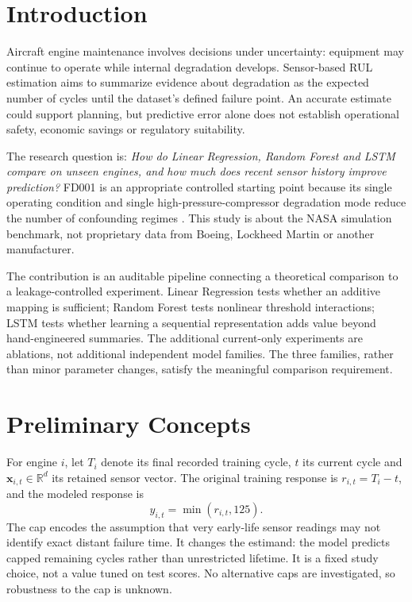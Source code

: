 \documentclass[11pt]{article}
\begin{document}
\section{Introduction}
Aircraft engine maintenance involves decisions under uncertainty: equipment may continue to operate while internal degradation develops. Sensor-based RUL estimation aims to summarize evidence about degradation as the expected number of cycles until the dataset's defined failure point. An accurate estimate could support planning, but predictive error alone does not establish operational safety, economic savings or regulatory suitability.

The research question is: \textit{How do Linear Regression, Random Forest and LSTM compare on unseen engines, and how much does recent sensor history improve prediction?} FD001 is an appropriate controlled starting point because its single operating condition and single high-pressure-compressor degradation mode reduce the number of confounding regimes \cite{nasa,saxena}. This study is about the NASA simulation benchmark, not proprietary data from Boeing, Lockheed Martin or another manufacturer.

The contribution is an auditable pipeline connecting a theoretical comparison to a leakage-controlled experiment. Linear Regression tests whether an additive mapping is sufficient; Random Forest tests nonlinear threshold interactions; LSTM tests whether learning a sequential representation adds value beyond hand-engineered summaries. The additional current-only experiments are ablations, not additional independent model families. The three families, rather than minor parameter changes, satisfy the meaningful comparison requirement.
\section{Preliminary Concepts}
For engine $i$, let $T_i$ denote its final recorded training cycle, $t$ its current cycle and $\mathbf{x}_{i,t}\in\mathbb R^d$ its retained sensor vector. The original training response is $r_{i,t}=T_i-t$, and the modeled response is
\begin{equation}
 y_{i,t}=\min(r_{i,t},125).
\end{equation}
The cap encodes the assumption that very early-life sensor readings may not identify exact distant failure time. It changes the estimand: the model predicts capped remaining cycles rather than unrestricted lifetime. It is a fixed study choice, not a value tuned on test scores. No alternative caps are investigated, so robustness to the cap is unknown.
\end{document}
